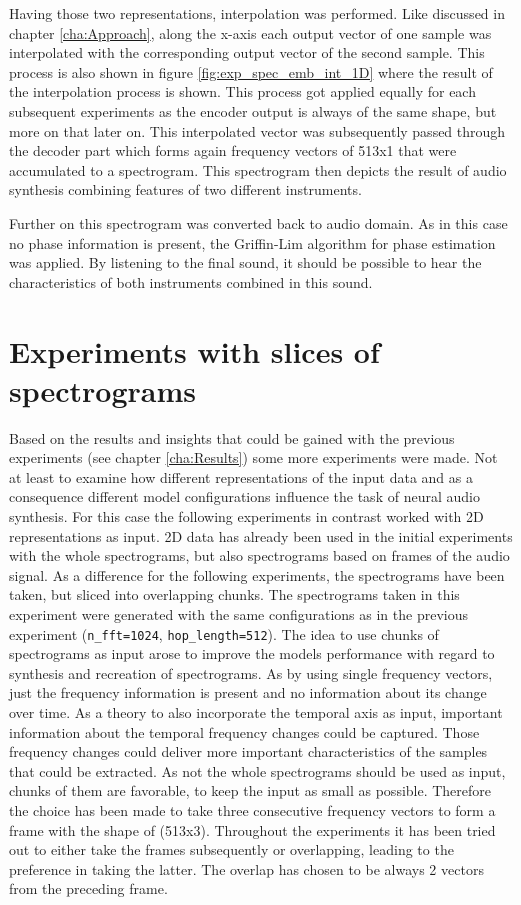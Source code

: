Having those two representations, interpolation was performed. Like discussed in chapter \ref{cha:Approach}, along the x-axis each output vector of one sample was interpolated with the corresponding output vector of the second sample. This process is also shown in figure \ref{fig:exp_spec_emb_int_1D} where the result of the interpolation process is shown. This process got applied equally for each subsequent experiments as the encoder output is always of the same shape, but more on that later on.
This interpolated vector was subsequently passed through the decoder part which forms again frequency vectors of 513x1 that were accumulated to a spectrogram. This spectrogram then depicts the result of audio synthesis combining features of two different instruments.

Further on this spectrogram was converted back to audio domain. As in this case no phase information is present, the Griffin-Lim algorithm \cite{Griffin1984} for phase estimation was applied. By listening to the final sound, it should be possible to hear the characteristics of both instruments combined in this sound.

\section{Experiments with slices of spectrograms}
\label{sec:exp_spec_slice}
Based on the results and insights that could be gained with the previous experiments (see chapter \ref{cha:Results}) some more experiments were made. Not at least to examine how different representations of the input data and as a consequence different model configurations influence the task of neural audio synthesis. For this case the following experiments in contrast worked with 2D representations as input. 2D data has already been used in the initial experiments with the whole spectrograms, but also spectrograms based on frames of the audio signal. As a difference for the following experiments, the spectrograms have been taken, but sliced into overlapping chunks. The spectrograms taken in this experiment were generated with the same configurations as in the previous experiment (\texttt{n\_fft=1024}, \texttt{hop\_length=512}). The idea to use chunks of spectrograms as input arose to improve the models performance with regard to synthesis and recreation of spectrograms. As by using single frequency vectors, just the frequency information is present and no information about its change over time. As a theory to also incorporate the temporal axis as input, important information about the temporal frequency changes could be captured. Those frequency changes could deliver more important characteristics of the samples that could be extracted. As not the whole spectrograms should be used as input, chunks of them are favorable, to keep the input as small as possible. Therefore the choice has been made to take three consecutive frequency vectors to form a frame with the shape of (513x3). Throughout the experiments it has been tried out to either take the frames subsequently or overlapping, leading to the preference in taking the latter. The overlap has chosen to be always 2 vectors from the preceding frame. 

